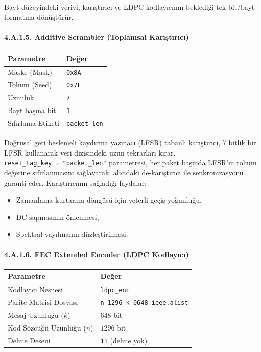 \documentclass[
]{IEEEtran}
\newcounter{none} %
\providecommand{\tightlist}{%
  \setlength{\itemsep}{0pt}\setlength{\parskip}{0pt}}
\begin{document}
Bayt düzeyindeki veriyi, karıştırıcı ve LDPC kodlayıcının beklediği tek
bit/bayt formatına dönüştürür.

\paragraph{4.A.1.5. Additive Scrambler (Toplamsal
Karıştırıcı)}\label{a.1.5.-additive-scrambler-toplamsal-karux131ux15ftux131rux131cux131}

{\def\LTcaptype{none} %
\begin{longtable}[]{@{}ll@{}}
\toprule\noalign{}
Parametre & Değer \\
\midrule\noalign{}
\endhead
\bottomrule\noalign{}
\endlastfoot
Maske (Mask) & \texttt{0x8A} \\
Tohum (Seed) & \texttt{0x7F} \\
Uzunluk & \texttt{7} \\
Bayt başına bit & \texttt{1} \\
Sıfırlama Etiketi & \texttt{packet\_len} \\
\end{longtable}
}

Doğrusal geri beslemeli kaydırma yazmacı (LFSR) tabanlı karıştırıcı, 7
bitlik bir LFSR kullanarak veri dizisindeki uzun tekrarları kırar.
\texttt{reset\_tag\_key\ =\ "packet\_len"} parametresi, her paket
başında LFSR'ın tohum değerine sıfırlanmasını sağlayarak, alıcıdaki
de-karıştırıcı ile senkronizasyonu garanti eder. Karıştırıcının
sağladığı faydalar:

\begin{itemize}
\tightlist
\item
  Zamanlama kurtarma döngüsü için yeterli geçiş yoğunluğu,
\item
  DC sapmasının önlenmesi,
\item
  Spektral yayılmanın düzleştirilmesi.
\end{itemize}

\paragraph{4.A.1.6. FEC Extended Encoder (LDPC
Kodlayıcı)}\label{a.1.6.-fec-extended-encoder-ldpc-kodlayux131cux131}

{\def\LTcaptype{none} %
\begin{longtable}[]{@{}ll@{}}
\toprule\noalign{}
Parametre & Değer \\
\midrule\noalign{}
\endhead
\bottomrule\noalign{}
\endlastfoot
Kodlayıcı Nesnesi & \texttt{ldpc\_enc} \\
Parite Matrisi Dosyası & \texttt{n\_1296\_k\_0648\_ieee.alist} \\
Mesaj Uzunluğu (\(k\)) & \(648\) bit \\
Kod Sözcüğü Uzunluğu (\(n\)) & \(1296\) bit \\
Delme Deseni & \texttt{\textquotesingle{}11\textquotesingle{}} (delme
yok) \\
\end{longtable}
}
\end{document}
